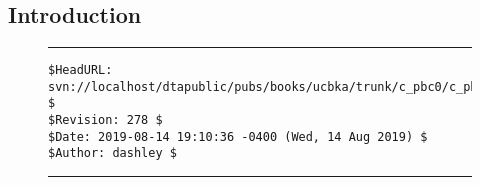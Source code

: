 
\chapter{\cpbczerolongtitle{}}

\label{cpbc0}


\section{Introduction}



\noindent\begin{figure}[!b]
\noindent\rule[-0.25in]{\textwidth}{1pt}
\begin{tiny}
\begin{verbatim}
$HeadURL: svn://localhost/dtapublic/pubs/books/ucbka/trunk/c_pbc0/c_pbc0.tex $
$Revision: 278 $
$Date: 2019-08-14 19:10:36 -0400 (Wed, 14 Aug 2019) $
$Author: dashley $
\end{verbatim}
\end{tiny}
\noindent\rule[0.25in]{\textwidth}{1pt}
\end{figure}
%
